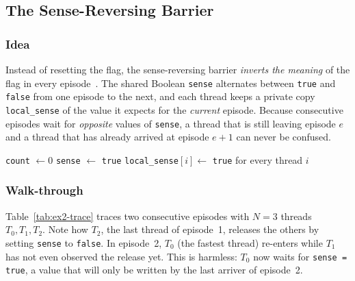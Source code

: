 \subsection{The Sense-Reversing Barrier}
\label{sec:ex2-algorithm}

\subsubsection{Idea}

Instead of resetting the flag, the sense-reversing barrier \emph{inverts the
meaning} of the flag in every episode~\cite{lecture04,herlihy2012,mcs1991}.
The shared Boolean \texttt{sense} alternates between \texttt{true} and
\texttt{false} from one episode to the next, and each thread keeps a private
copy \texttt{local\_sense} of the value it expects for the \emph{current}
episode. Because consecutive episodes wait for \emph{opposite} values of
\texttt{sense}, a thread that is still leaving episode $e$ and a thread that
has already arrived at episode $e+1$ can never be confused.

\begin{algorithm}[H]
\caption{Sense-reversing barrier (lecture 04, slide 14)}
\label{alg:ex2-srb}
\KwShared \texttt{count} $\gets 0$
\KwShared \texttt{sense} $\gets$ \texttt{true}
\KwLocal \texttt{local\_sense}$[i] \gets$ \texttt{true} for every thread $i$\;
\BlankLine
{}
\end{algorithm}

\subsubsection{Walk-through}

Table~\ref{tab:ex2-trace} traces two consecutive episodes with $N=3$ threads
$T_0,T_1,T_2$. Note how $T_2$, the last thread of episode~1, releases the
others by setting \texttt{sense} to \texttt{false}. In episode~2, $T_0$ (the
fastest thread) re-enters while $T_1$ has not even observed the release
yet. This is harmless: $T_0$ now waits for \texttt{sense = true}, a value
that will only be written by the last arriver of episode~2.


